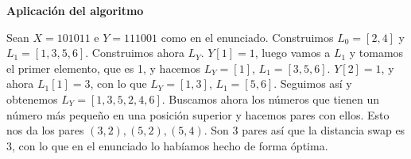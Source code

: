 \documentclass[twoside]{article}
\begin{document}
\begin{solucion}
\newpage

\textbf{Aplicación del algoritmo}

Sean $X=101011$ e $Y=111001$ como en el enunciado. Construimos $L_0=[2,4]$ y $L_1=[1,3,5,6]$. Construimos ahora $L_Y$. $Y[1]=1$, luego vamos a $L_1$ y tomamos el primer elemento, que es 1, y hacemos $L_Y=[1]$, $L_1=[3,5,6]$. $Y[2]=1$, y ahora $L_1[1]=3$, con lo que $L_Y=[1,3]$, $L_1=[5,6]$. Seguimos así y obtenemos $L_Y=[1,3,5,2,4,6]$. Buscamos ahora los números que tienen un número más pequeño en una posición superior y hacemos pares con ellos. Esto nos da los pares $(3,2), (5,2), (5,4)$. Son 3 pares así que la distancia swap es 3, con lo que en el enunciado lo habíamos hecho de forma óptima. 

%






%
%
%




\end{solucion}
\end{document}
